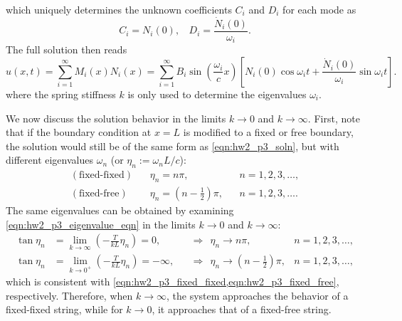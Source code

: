 which uniquely determines the unknown coefficients $C_i$ and $D_i$ for each mode as 
\begin{equation}
    C_i = N_i(0), ~~~~ D_i = \frac{\dot{N}_i(0)}{\omega_i}.
\end{equation}
The full solution then reads 
\begin{equation}\label{eqn:hw2_p3_soln}
    \boxed{u(x, t) = \sum_{i=1}^\infty M_i(x) N_i(x) = \sum_{i=1}^\infty B_i \sin\left(\frac{\omega_i}{c} x\right)\left[ N_i(0) \cos\omega_i t + \frac{\dot{N}_i(0)}{\omega_i} \sin\omega_i t \right]}.
\end{equation}
where the spring stiffness $k$ is only used to determine the eigenvalues $\omega_i$. 

We now discuss the solution behavior in the limits $k \rightarrow 0$ and $k \rightarrow \infty$. 
First, note that if the boundary condition at $x = L$ is modified to a fixed or free boundary, the solution would still be of the same form as \cref{eqn:hw2_p3_soln}, but with different eigenvalues $\omega_n$ (or $\eta_n := \omega_n L / c$):
\begin{subequations}
\begin{align}
    \label{eqn:hw2_p3_fixed_fixed}(\textrm{fixed-fixed}) ~~~~& \eta_n = n\pi, && n = 1, 2, 3, \ldots, \\
    \label{eqn:hw2_p3_fixed_free}(\textrm{fixed-free}) ~~~~& \eta_n = \left(n - \frac{1}{2}\right)\pi, && n = 1, 2, 3, \ldots.
\end{align}
\end{subequations}
The same eigenvalues can be obtained by examining \cref{eqn:hw2_p3_eigenvalue_eqn} in the limits $k \rightarrow 0$ and $k \rightarrow \infty$:
\begin{subequations}
\begin{align}
    \tan\eta_n &= \lim_{k\rightarrow \infty}\left(- \frac{T}{kL}\eta_n\right) = 0, && \Rightarrow ~~ \eta_n \rightarrow n\pi, & n = 1, 2, 3, \ldots, \\
    \tan\eta_n &= \lim_{k\rightarrow 0^+}\left(- \frac{T}{kL}\eta_n\right) = -\infty, && \Rightarrow ~~ \eta_n \rightarrow \left(n - \frac{1}{2}\right)\pi, & n = 1, 2, 3, \ldots,
\end{align}
\end{subequations}
which is consistent with \cref{eqn:hw2_p3_fixed_fixed,eqn:hw2_p3_fixed_free}, respectively.
Therefore, when $k\rightarrow \infty$, the system approaches the behavior of a fixed-fixed string, while for $k\rightarrow 0$, it approaches that of a fixed-free string. 

